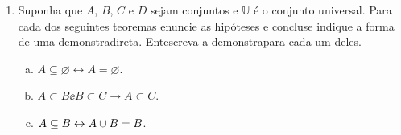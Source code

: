 \begin{enumerate}[{\bf 1.}]
\begin{enumerate}[a)]
{\bf{\it Resposta:} Seja ${\bf x\in (A\inter B)^C}$, assim ${\bf x\notin A\inter B}$ ou seja, ${\bf x\notin A}$ ou ${\bf x\notin B}$, portanto ${\bf x\in A^C}$ ou ${\bf x\in B^C}$. Logo, ${\bf x\in A^C\uni B^C}$. Por outro lado, seja ${\bf x\in A^C\uni B^C}$, assim ${\bf x\notin A}$ e ${\bf x\notin B}$, portanto ${\bf x\notin A\inter B}$ que implica que ${\bf x\in (A\inter B)^C}$.}

\item $A\uni(B-A)=A\uni B$.

{\bf{\it Resposta:} Seja ${\bf x\in A\uni(B-A)}$. Se ${\bf x\in A}$, o teorema estar\'a demonstrado, logo suponha que ${\bf x\in B-A}$. Ent\ao ${\bf x\in B}$ e ${\bf x\notin A}$. Assim, ${\bf x\in A\uni B}$ e portanto, ${\bf A\uni(B-A)\subseteq A\uni B}$. Agora, suponha que ${\bf x\in A\uni B}$. Ent\ao ${\bf x\in A}$ ou ${\bf x\in B}$. Se ${\bf x\in A}$, o resultado est\'a provado, portanto suponha que ${\bf x\notin A}$. Ent\ao ${\bf x\in B}$ e consequentemente temos ${\bf x\in B-A}$ e assim completamos a demonstra\caoi.}
\item $(A\uni B)-(A\inter B)=(A-B)\uni(B-A)$.

\item $A-(B\uni C)=(A-B)\inter(A-C)$.

{\bf{\it Resposta:} Seja ${\bf x\in A-(B\uni C)}$. Assim, ${\bf x\in A}$ e ${\bf x\notin B\uni C}$. Portanto, ${\bf x\in A}$ e ${\bf x\notin B}$ e ${\bf x\notin C}$. Logo, ${\bf x\in A-B}$ e ${\bf x\in A-C}$. Portanto, ${\bf x\in (A-B)\inter(A-C)}$. Agora, seja ${\bf x\in (A-B)\inter(A-C)}$, ent\ao ${\bf x\in A-B}$ e ${\bf x\in A-C}$. Logo, ${\bf x\in A}$ e ${\bf x\notin B}$ e, ${\bf x\in A}$ e ${\bf x\notin C}$. Portanto, ${\bf x\in A}$ e ${\bf x\notin B\uni C}$ e assim $x\in A\inter(B\uni C)$.}

\item $A\uni(B\inter C)=(A\uni B)\inter(A\uni C)$.
\item $A\inter(B\uni C)=(A\inter B)\uni(A\inter C)$.
\end{enumerate}

\item \label{conjuntos6} Suponha que $A$, $B$, $C$ e $D$ sejam conjuntos e $\mathbb{U}$ \'e o conjunto universal. Para cada dos seguintes teoremas enuncie as hip\'oteses e conclus\aoi e indique a forma de uma demonstra\cao direta. Ent\ao escreva a demonstra\cao para cada um deles.
\begin{enumerate}[a)]
\item $A\subseteq\varnothing\leftrightarrow A=\varnothing$.
\item $A\subset B\ee B\subset C\to A\subset C$.
\item $A\subseteq B\leftrightarrow A\cup B=B$. 


\end{enumerate}
\end{enumerate}
